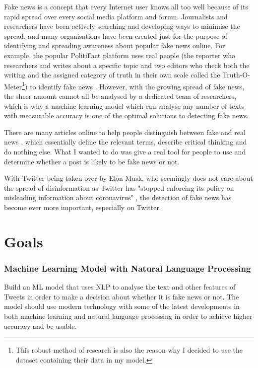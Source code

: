 \documentclass{l4proj}
\begin{document}
Fake news is a concept that every Internet user knows all too well because of its rapid spread over every social media platform and forum. Journalists and researchers have been actively searching and developing ways to minimise the spread, and many organisations have been created just for the purpose of identifying and spreading awareness about popular fake news online. For example, the popular PolitiFact platform uses real people (the reporter who researchers and writes about a specific topic and two editors who check both the writing and the assigned category of truth in their own scale called the Truth-O-Meter\footnote{This robust method of research is also the reason why I decided to use the dataset containing their data in my model.}) to identify fake news \citep{PolitiFact}. However, with the growing spread of fake news, the sheer amount cannot all be analysed by a dedicated team of researchers, which is why a machine learning model which can analyse any number of texts with measurable accuracy is one of the optimal solutions to detecting fake news.

There are many articles online to help people distinguish between fake and real news \citep{FakeRealHelp}, which essentially define the relevant terms, describe critical thinking and do nothing else. What I wanted to do was give a real tool for people to use and determine whether a post is likely to be fake news or not.

With Twitter being taken over by Elon Musk, who seemingly does not care about the spread of disinformation as Twitter has "stopped enforcing its policy on misleading information about coronavirus" \citep{TwitterCovid}, the detection of fake news has become ever more important, especially on Twitter. 


\section{Goals}

\subsubsection{Machine Learning Model with Natural Language Processing}

Build an ML model that uses NLP to analyse the text and other features of Tweets in order to make a decision about whether it is fake news or not. The model should use modern technology with some of the latest developments in both machine learning and natural language processing in order to achieve higher accuracy and be usable.
\end{document}
